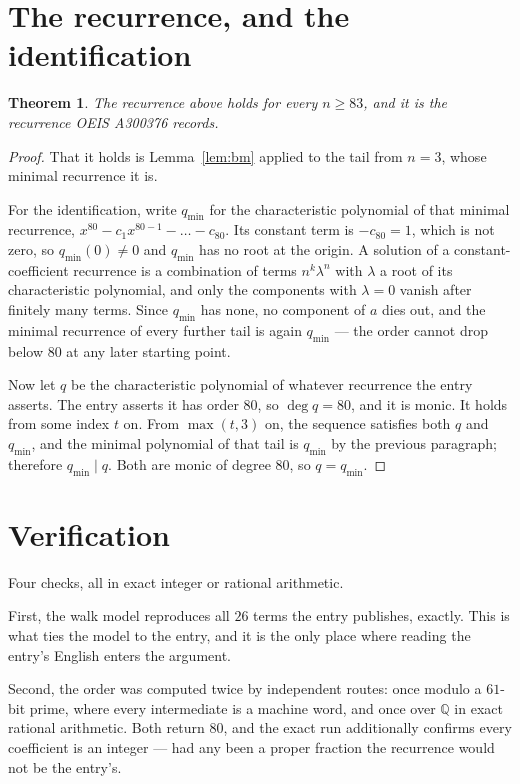 \documentclass[11pt,a4paper]{article}
\theoremstyle{plain}
\newtheorem{theorem}{Theorem}
\theoremstyle{definition}
\begin{document}
\section{The recurrence, and the identification}

\begin{theorem}
The recurrence above holds for every $n\ge83$, and it is the recurrence OEIS A300376 records.
\end{theorem}

\begin{proof}
That it holds is Lemma~\ref{lem:bm} applied to the tail from $n=3$, whose minimal
recurrence it is.

For the identification, write $q_{\min}$ for the characteristic polynomial of that minimal
recurrence, $x^{80}-c_1x^{80-1}-\dots-c_{80}$. Its constant term is
$-c_{80}=1$, which is not zero, so $q_{\min}(0)\neq0$ and $q_{\min}$ has no
root at the origin. A solution of a constant-coefficient recurrence is a combination of terms
$n^{k}\lambda^{n}$ with $\lambda$ a root of its characteristic polynomial, and only the
components with $\lambda=0$ vanish after finitely many terms. Since $q_{\min}$ has none, no
component of $a$ dies out, and the minimal recurrence of every further tail is again
$q_{\min}$ --- the order cannot drop below $80$ at any later starting point.

Now let $q$ be the characteristic polynomial of whatever recurrence the entry asserts. The
entry asserts it has order $80$, so $\deg q=80$, and it is monic. It holds from some
index $t$ on. From $\max(t,3)$ on, the sequence satisfies both $q$ and $q_{\min}$, and
the minimal polynomial of that tail is $q_{\min}$ by the previous paragraph; therefore
$q_{\min}\mid q$. Both are monic of degree $80$, so $q=q_{\min}$.
\end{proof}

\section{Verification}

Four checks, all in exact integer or rational arithmetic.

First, the walk model reproduces all $26$ terms the entry publishes, exactly. This is
what ties the model to the entry, and it is the only place where reading the entry's English
enters the argument.

Second, the order was computed twice by independent routes: once modulo a $61$-bit prime, where
every intermediate is a machine word, and once over $\mathbb{Q}$ in exact rational arithmetic.
Both return $80$, and the exact run additionally confirms every coefficient is an integer
--- had any been a proper fraction the recurrence would not be the entry's.
\end{document}
